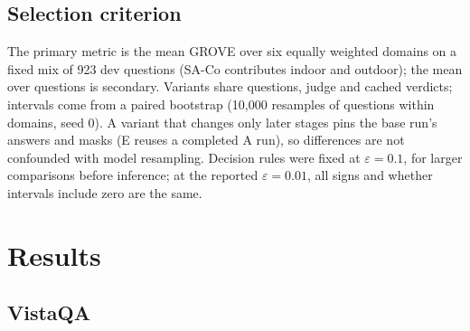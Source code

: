 \documentclass{article}
\begin{document}
\subsection{Selection criterion}
\label{sec:selection}

The primary metric is the mean GROVE over six equally weighted domains on a fixed mix of 923 dev questions
(SA-Co contributes indoor and outdoor); the mean over questions is secondary.
Variants share questions, judge and cached verdicts;
intervals come from a paired bootstrap (10{,}000 resamples of questions within domains, seed 0).
A variant that changes only later stages pins the base run's answers and masks (E reuses a completed A run),
so differences are not confounded with model resampling.
Decision rules were fixed at $\varepsilon=0.1$, for larger comparisons before inference;
at the reported $\varepsilon=0.01$, all signs and whether intervals include zero are the same.

\section{Results}
\label{sec:results}

\subsection{VistaQA}
\end{document}
